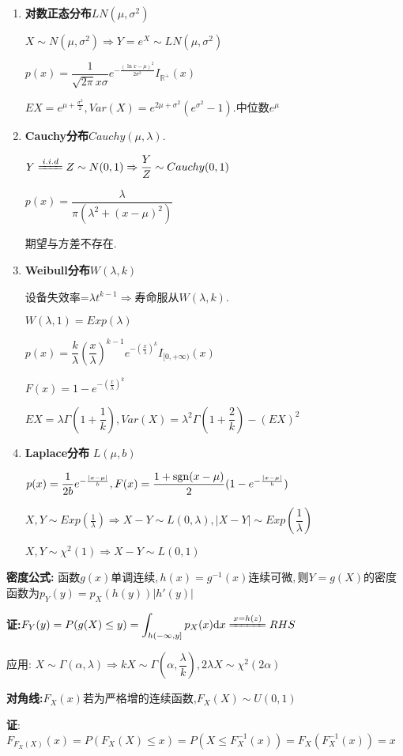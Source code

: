 \begin{enumerate}
  \item \textbf{对数正态分布}$ LN(\mu, \sigma^2)$

    $ X\sim N(\mu,\sigma^2)\Rightarrow Y = e^{X}\sim LN(\mu,\sigma^2)$

    $ p(x) = \dfrac{1}{\sqrt{2\pi}x\sigma}e^{-\frac{(\ln x- \mu)^2}{2\sigma^2}}I_{\mathbb{R}^{+}}(x)$

    $ EX = e^{\mu + \frac{\sigma^2}{2}}, Var(X) = e^{2\mu+\sigma^2}(e^{\sigma^2}-1). 中位数e^\mu$

  \item \textbf{Cauchy分布}$ Cauchy(\mu, \lambda).$

    $ Y \xlongequal{i.i.d} Z \sim N(0,1) \Rightarrow \dfrac{Y}{Z}\sim Cauchy(0,1)$

    $ p(x) = \dfrac{\lambda}{\pi(\lambda^2 +(x-\mu)^2)}$

    期望与方差不存在.

  \item \textbf{Weibull分布}$ W(\lambda,k)$

    设备失效率=$ \lambda t^{k-1}\Rightarrow  寿命服从W(\lambda,k). $

    $ W(\lambda,1) = Exp(\lambda)$

    $ p(x) = \dfrac{k}{\lambda}(\dfrac{x}{\lambda})^{k-1}e^{-(\frac{x}{\lambda})^k}I_{[0,+\infty)}(x)$

      $ F(x) = 1-e^{-(\frac{x}{\lambda})^k}$

      $ EX = \lambda \Gamma(1+\dfrac{1}{k}), Var(X) = \lambda^2\Gamma(1+\dfrac{2}{k})-(EX)^2$

    \item \textbf{Laplace分布} $ L(\mu,b)$

      $ p(x)=\dfrac{1}{2b}e^{-\frac{|x-\mu|}{b}}, F(x)=\dfrac{1+\operatorname{sgn}(x-\mu)}{2}(1-e^{-\frac{|x-\mu|}{b}})$

      $ X,Y\sim Exp(\frac{1}{\lambda})\Rightarrow X-Y\sim L(0,\lambda), |X-Y|\sim Exp(\dfrac{1}{\lambda})$

      $ X,Y\sim \chi^2(1)\Rightarrow X-Y\sim L(0,1)$

\end{enumerate}

\textbf{密度公式:}
函数$g(x)单调连续,h(x) = g^{-1}(x)连续可微,则Y = g(X)$的密度函数为$ p_Y(y) = p_X(h(y))|h'(y)|$

\textbf{证:}$F_Y(y) = P(g(X)\le y)=\int_{h(-\infty,y]}{p_X(x)\mathrm{d}x} \xlongequal{x=h(z)}RHS$

应用: $X\sim \Gamma(\alpha, \lambda) \Rightarrow  kX \sim \Gamma(\alpha, \dfrac{\lambda}{k}), 2\lambda X \sim \chi^2(2\alpha)$

\textbf{对角线:}$ F_X(x)$若为严格增的连续函数,$F_X(X) \sim U(0,1)$

\textbf{证}:$ F_{F_X(X)}(x) = P(F_X(X)\le x) = P(X \le F_X^{-1}(x)) = F_X(F_X^{-1}(x)) =x$
